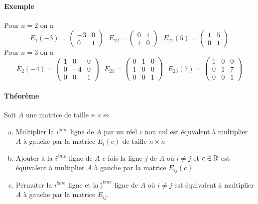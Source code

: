\paragraph{Exemple} Pour $n=2$ on a
$$E_1(-3)=\begin{pmatrix}-3&0\\0&1\end{pmatrix} \text{  } E_{1 2}=\begin{pmatrix}0&1\\1&0\end{pmatrix} \text{  } E_{2 1}(5)=\begin{pmatrix}1&5\\0&1\end{pmatrix}$$
 Pour $n=3$ on a
$$E_2(-4)=\begin{pmatrix}1&0&0\\0&-4&0\\0&0&1\end{pmatrix} \text{  } E_{2 1}=\begin{pmatrix}0&1&0\\1&0&0\\0&0&1\end{pmatrix} \text{  } E_{2 3}(7)=\begin{pmatrix}1&0&0\\0&1&7\\0&0&1\end{pmatrix}$$

\paragraph{Théorème} Soit $A$ une matrice de taille $n\times m$
\begin{enumerate}[a)]
  \item Multiplier la $i^{ème}$ ligne de $A$ par un réel $c$ non nul est équvalent à multiplier $A$ à gauche par la matrice $E_i(c)$ de taille $n \times n$
  
  \item Ajouter à la $i^{ème}$ ligne de $A$ $c$-fois la ligne $j$ de $A$ où $i\neq j$ et $c\in \mathbb{R}$ est équivalent à multiplier $A$ à gauche par la matrice $E_{ij}(c)$.
  
  \item Permuter la $i^{ème}$ ligne et la $ĵ^{ème}$ ligne de $A$ où $i\neq j$ est équivalent à multiplier $A$ à gauche par la matrice $E_{ij}$.
\end{enumerate}

